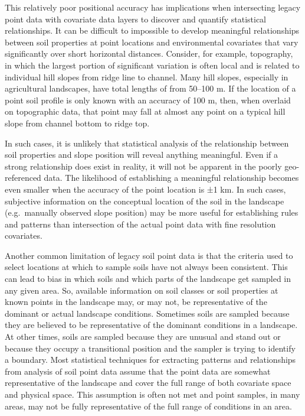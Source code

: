 \documentclass[graybox,natbib,nospthms,UStrade]{svmono}
\begin{document}
This relatively poor positional accuracy has implications when
intersecting legacy point data with covariate data layers to discover
and quantify statistical relationships. It can be difficult to
impossible to develop meaningful relationships between soil properties
at point locations and environmental covariates that vary significantly
over short horizontal distances. Consider, for example, topography, in
which the largest portion of significant variation is often local and is
related to individual hill slopes from ridge line to channel. Many hill
slopes, especially in agricultural landscapes, have total lengths of
from 50--100 m. If the location of a point soil profile is only known
with an accuracy of 100 m, then, when overlaid on topographic data, that
point may fall at almost any point on a typical hill slope from channel
bottom to ridge top.

In such cases, it is unlikely that statistical analysis of the
relationship between soil properties and slope position will reveal
anything meaningful. Even if a strong relationship does exist in
reality, it will not be apparent in the poorly geo-referenced data. The
likelihood of establishing a meaningful relationship becomes even
smaller when the accuracy of the point location is ±1 km. In such cases,
subjective information on the conceptual location of the soil in the
landscape (e.g.~manually observed slope position) may be more useful for
establishing rules and patterns than intersection of the actual point
data with fine resolution covariates.

Another common limitation of legacy soil point data is that the criteria
used to select locations at which to sample soils have not always been consistent. This
can lead to bias in which soils and which parts of the landscape get
sampled in any given area. So, available information on soil classes or
soil properties at known points in the landscape may, or may not, be
representative of the dominant or actual landscape conditions. Sometimes
soils are sampled because they are believed to be representative of the
dominant conditions in a landscape. At other times, soils are sampled
because they are unusual and stand out or because they occupy a
transitional position and the sampler is trying to identify a boundary.
Most statistical techniques for extracting patterns and relationships
from analysis of soil point data assume that the point data are somewhat
representative of the landscape and cover the full range of both
covariate space and physical space. This assumption is often not met and
point samples, in many areas, may not be fully representative of the
full range of conditions in an area.
\end{document}
